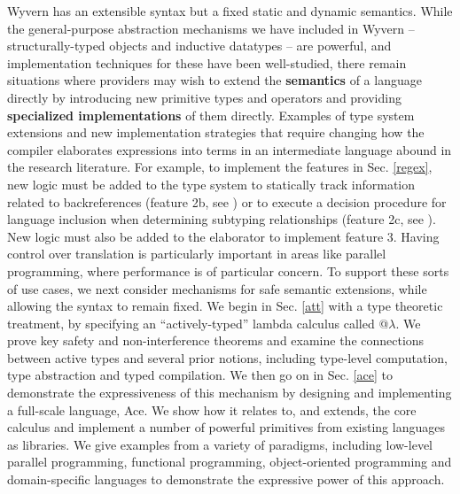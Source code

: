 Wyvern has an extensible syntax but a fixed static and dynamic semantics. While the general-purpose abstraction mechanisms we have included in Wyvern -- structurally-typed objects and inductive datatypes -- are powerful, and implementation techniques for these have been well-studied, there remain situations where providers may wish to extend the \textbf{semantics} of a language directly by introducing new primitive types and operators and providing \textbf{specialized implementations} of them directly. Examples of type system extensions and new implementation strategies that require changing how the compiler elaborates expressions into terms in an intermediate language abound in the research literature. For example, to implement the features in Sec. \ref{regex}, new logic must be added to the type system to statically track information related to backreferences (feature 2b, see \cite{spishak2012type}) or to execute a decision procedure for language inclusion when determining subtyping relationships (feature 2c, see \cite{fulton-thesis}). New logic must also be added to the elaborator to implement feature 3. Having control over translation is particularly important in areas like parallel programming, where performance is of particular concern. To support these sorts of use cases, we next consider mechanisms for safe semantic extensions, while allowing the syntax to remain fixed. We begin in Sec. \ref{att} with a type theoretic treatment, by specifying an ``actively-typed'' lambda calculus called @$\lambda$. We prove key safety and non-interference theorems and examine the connections between active types and several prior notions, including type-level computation, type abstraction and typed compilation. We then go on in Sec. \ref{ace} to demonstrate the expressiveness of this mechanism by designing and implementing a full-scale language, Ace. We show how it relates to, and extends, the core calculus and implement a number of powerful primitives from existing languages as libraries. We give examples from a variety of paradigms, including low-level parallel programming, functional programming,  object-oriented programming and domain-specific languages to demonstrate the expressive power of this approach.

